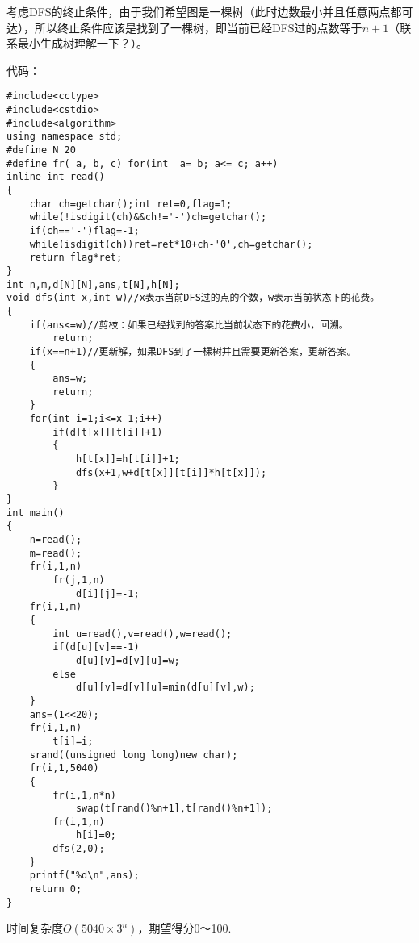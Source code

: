考虑DFS的终止条件，由于我们希望图是一棵树（此时边数最小并且任意两点都可达），所以终止条件应该是找到了一棵树，即当前已经DFS过的点数等于$n+1$（联系最小生成树理解一下？）。

代码：
\begin{verbatim}
#include<cctype>
#include<cstdio>
#include<algorithm>
using namespace std;
#define N 20
#define fr(_a,_b,_c) for(int _a=_b;_a<=_c;_a++)
inline int read()
{
	char ch=getchar();int ret=0,flag=1;
	while(!isdigit(ch)&&ch!='-')ch=getchar();
	if(ch=='-')flag=-1;
	while(isdigit(ch))ret=ret*10+ch-'0',ch=getchar();
	return flag*ret;
}
int n,m,d[N][N],ans,t[N],h[N];
void dfs(int x,int w)//x表示当前DFS过的点的个数，w表示当前状态下的花费。
{
    if(ans<=w)//剪枝：如果已经找到的答案比当前状态下的花费小，回溯。
        return;
    if(x==n+1)//更新解，如果DFS到了一棵树并且需要更新答案，更新答案。
    {
        ans=w;
        return;
    }
    for(int i=1;i<=x-1;i++)
        if(d[t[x]][t[i]]+1)
        {
            h[t[x]]=h[t[i]]+1;
            dfs(x+1,w+d[t[x]][t[i]]*h[t[x]]);
        }
}
int main()
{
    n=read();
    m=read();
    fr(i,1,n)
        fr(j,1,n)
            d[i][j]=-1;
    fr(i,1,m)
    {
        int u=read(),v=read(),w=read();
        if(d[u][v]==-1)
            d[u][v]=d[v][u]=w;
        else
            d[u][v]=d[v][u]=min(d[u][v],w);
    }
    ans=(1<<20);
    fr(i,1,n)
        t[i]=i;
    srand((unsigned long long)new char);
    fr(i,1,5040)
    {
        fr(i,1,n*n)
            swap(t[rand()%n+1],t[rand()%n+1]);
        fr(i,1,n)
            h[i]=0;
        dfs(2,0);
    }
    printf("%d\n",ans);
    return 0;
}
\end{verbatim}

时间复杂度$O(5040\times 3^n)$，期望得分0～100.

